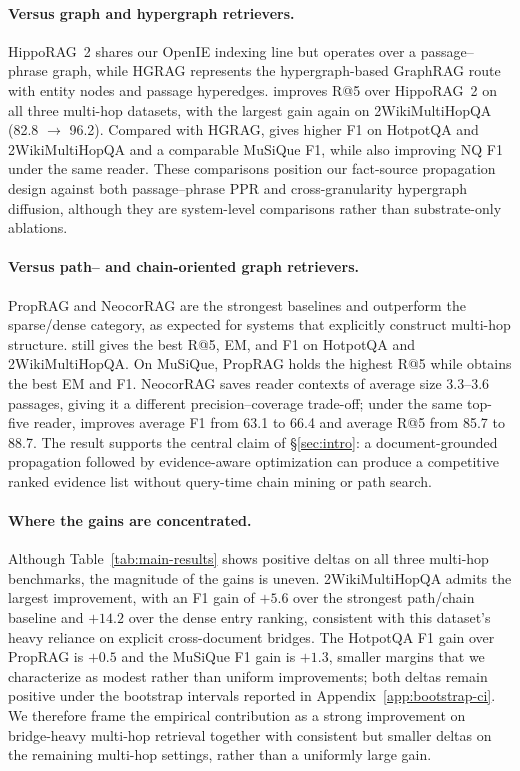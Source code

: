 \paragraph{Versus graph and hypergraph retrievers.}
HippoRAG~2 shares our OpenIE indexing line but operates over a
passage--phrase graph, while HGRAG represents the hypergraph-based
GraphRAG route with entity nodes and passage hyperedges. \methodname{}
improves R@5 over HippoRAG~2 on all three multi-hop datasets, with the
largest gain again on 2WikiMultiHopQA (82.8 $\to$ 96.2). Compared with
HGRAG, \methodname{} gives higher F1 on HotpotQA and 2WikiMultiHopQA
and a comparable MuSiQue F1, while also improving NQ F1 under the same
reader. These comparisons position our fact-source propagation design
against both passage--phrase PPR and cross-granularity hypergraph
diffusion, although they are system-level comparisons rather than
substrate-only ablations.

\paragraph{Versus path-- and chain-oriented graph retrievers.}
PropRAG and NeocorRAG are the strongest baselines and outperform the
sparse/dense category, as expected for systems that explicitly
construct multi-hop structure. \methodname{} still gives the best R@5,
EM, and F1 on HotpotQA and 2WikiMultiHopQA. On MuSiQue, PropRAG holds
the highest R@5 while \methodname{} obtains the best EM and F1.
NeocorRAG saves reader contexts of average size 3.3--3.6 passages,
giving it a different precision--coverage trade-off; under the same
top-five reader, \methodname{} improves average F1 from 63.1 to 66.4
and average R@5 from 85.7 to 88.7. The result supports the central
claim of \S\ref{sec:intro}: a document-grounded propagation followed
by evidence-aware optimization can produce a competitive ranked
evidence list without query-time chain mining or path search.

\paragraph{Where the gains are concentrated.}
Although Table~\ref{tab:main-results} shows positive deltas on all
three multi-hop benchmarks, the magnitude of the gains is uneven.
2WikiMultiHopQA admits the largest improvement, with an F1 gain of
$+5.6$ over the strongest path/chain baseline and $+14.2$ over the
dense entry ranking, consistent with this dataset's heavy reliance on
explicit cross-document bridges. The HotpotQA F1 gain over PropRAG is
$+0.5$ and the MuSiQue F1 gain is $+1.3$, smaller margins that we
characterize as modest rather than uniform improvements; both deltas
remain positive under the bootstrap intervals reported in
Appendix~\ref{app:bootstrap-ci}. We therefore frame the empirical
contribution as a strong improvement on bridge-heavy multi-hop
retrieval together with consistent but smaller deltas on the
remaining multi-hop settings, rather than a uniformly large gain.

